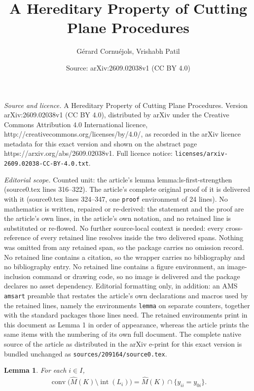 \documentclass[10pt,a4paper]{amsart}
\title{A Hereditary Property of Cutting Plane Procedures\vspace{-0em}}
\author{G\'erard Cornu\'ejols, Vrishabh Patil}
\date{Source: arXiv:2609.02038v1 (CC BY 4.0)}
\newtheorem{lemma}{Lemma}
\begin{document}
\maketitle

\noindent\emph{Source and licence.} A Hereditary Property of Cutting Plane Procedures\vspace{-0em}. Version arXiv:2609.02038v1 (CC BY 4.0), distributed by arXiv under the Creative Commons Attribution 4.0 International licence, http://creativecommons.org/licenses/by/4.0/, as recorded in the arXiv licence metadata for this exact version and shown on the abstract page https://arxiv.org/abs/2609.02038v1. Full licence notice: \texttt{licenses/arxiv-2609.02038-CC-BY-4.0.txt}.\par\smallskip

\noindent\textit{Editorial scope.} Counted unit: the article's lemma lemma:ls-first-strengthen (source0.tex lines 316--322). The article's complete original proof of it is delivered with it (source0.tex lines 324--347, one \texttt{proof} environment of 24 lines). No mathematics is written, repaired or re-derived: the statement and the proof are the article's own lines, in the article's own notation, and no retained line is substituted or re-flowed.  No further source-local context is needed: every cross-reference of every retained line resolves inside the two delivered spans.  Nothing was omitted from any retained span, so the package carries no omission record.  No retained line contains a citation, so the wrapper carries no bibliography and no bibliography entry.  No retained line contains a figure environment, an image-inclusion command or drawing code, so no image is delivered and the package declares no asset dependency.  Editorial formatting only, in addition: an AMS \texttt{amsart} preamble that restates the article's own declarations and macros used by the retained lines, namely the environments \texttt{lemma} on separate counters, together with the standard packages those lines need.  The retained environments print in this document as Lemma 1 in order of appearance, whereas the article prints the same items with the numbering of its own full document.  The complete native source of the article as distributed in the arXiv e-print for this exact version is bundled unchanged as \texttt{sources/209164/source0.tex}.
\begin{lemma} \label{lemma:ls-first-strengthen}
    For each $i \in I$,
    \begin{align}
        \operatorname{conv}\bigl(\hat M(K) \setminus \operatorname{int}(L_i)\bigr)
        = \hat M(K) \cap \{ y_{ii} = y_{0i}\}.
    \end{align}
\end{lemma}
\end{document}
